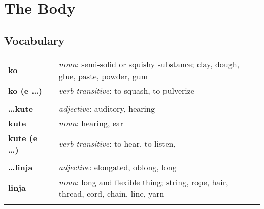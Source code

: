 \section{The Body}
%
\subsection*{Vocabulary}
%
\begin{supertabular}{p{2,5cm}|ll}
    \textbf{ko}               &  & \textit{noun}: semi-solid or squishy substance; clay, dough, glue, paste, powder, gum       \\ %
    \textbf{ko (e \dots)}     &  & \textit{verb transitive}: to squash, to pulverize                                           \\ %
                              &  &                                                                                             \\ %
    \textbf{\dots kute}       &  & \textit{adjective}: auditory, hearing                                                       \\ %
    \textbf{kute}             &  & \textit{noun}: hearing, ear                                                                 \\ %
    \textbf{kute (e \dots)}   &  & \textit{verb transitive}: to hear, to listen,                                               \\ %
                              &  &                                                                                             \\ %
    \textbf{\dots linja}      &  & \textit{adjective}: elongated, oblong, long                                                 \\ %
    \textbf{linja}            &  & \textit{noun}: long and flexible thing; string, rope, hair, thread, cord, chain, line, yarn \\ %
                              &  &                                                                                             \\ %

\end{supertabular}
